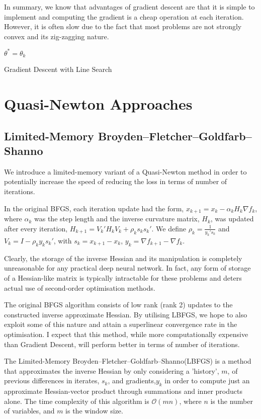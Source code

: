 \documentclass{article}
\begin{document}
In summary, we know that advantages of gradient descent are that it is simple to implement and computing the gradient is a cheap operation at each iteration. However, it is often slow due to the fact that most problems are not strongly convex and its zig-zagging nature.


\begin{algorithm}[H]
\SetAlgoLined
\KwResult{$\theta^{*}$ } 
 $\theta^* = \theta_k$\;
 \caption{Gradient Descent with Line Search}
 \end{algorithm}
 
 \section{Quasi-Newton Approaches}
\subsection{Limited-Memory Broyden–Fletcher–Goldfarb–Shanno}

We introduce a limited-memory variant of a Quasi-Newton method in order to potentially increase the speed of reducing the loss in terms of number of iterations. 

In the original BFGS, each iteration update had the form, $x_{k+1} = x_{k} - \alpha_k H_k \nabla f_k$, where $\alpha_k$ was the step length and the inverse curvature matrix, $H_k$, was updated after every iteration, $H_{k+1} = V_k'H_kV_k + \rho_ks_ks_k'$. We define $\rho_k = \frac{1}{y_k's_k}$ and $V_k = I - \rho_ky_ks_k'$, with $s_k = x_{k+1} - x_k$, $y_k = \nabla f_{k+1} - \nabla f_k$.

Clearly, the storage of the inverse Hessian and its manipulation is completely unreasonable for any practical deep neural network. In fact, any form of storage of a Hessian-like matrix is typically intractable for these problems and deters actual use of second-order optimisation methods.

The original BFGS algorithm consists of low rank (rank 2) updates to the constructed inverse approximate Hessian. By utilising LBFGS, we hope to also exploit some of this nature and attain a superlinear convergence rate in the optimisation. I expect that this method, while more computationally expensive than Gradient Descent, will perform better in terms of number of iterations.

The Limited-Memory Broyden–Fletcher–Goldfarb–Shanno(LBFGS) is a method that approximates the inverse Hessian by only considering a 'history', $m$, of previous differences in iterates, $s_k$, and gradients,$y_k$ in order to compute just an approximate Hessian-vector product through summations and inner products alone. The time complexity of this algorithm is $\mathcal{O}(mn)$, where $n$ is the number of variables, and $m$ is the window size.
\end{document}
